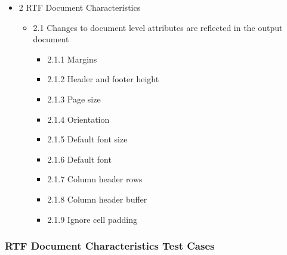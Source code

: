 \documentclass[]{article}
\providecommand{\tightlist}{%
  \setlength{\itemsep}{0pt}\setlength{\parskip}{0pt}}
\begin{document}
\begin{itemize}
\tightlist
\item
  2 RTF Document Characteristics

  \begin{itemize}
  \tightlist
  \item
    2.1 Changes to document level attributes are reflected in the output
    document

    \begin{itemize}
    \tightlist
    \item
      2.1.1 Margins
    \item
      2.1.2 Header and footer height
    \item
      2.1.3 Page size
    \item
      2.1.4 Orientation
    \item
      2.1.5 Default font size
    \item
      2.1.6 Default font
    \item
      2.1.7 Column header rows
    \item
      2.1.8 Column header buffer
    \item
      2.1.9 Ignore cell padding
    \end{itemize}
  \end{itemize}
\end{itemize}

\hypertarget{rtf-document-characteristics-test-cases}{%
\subsubsection{RTF Document Characteristics Test
Cases}\label{rtf-document-characteristics-test-cases}}
\end{document}
